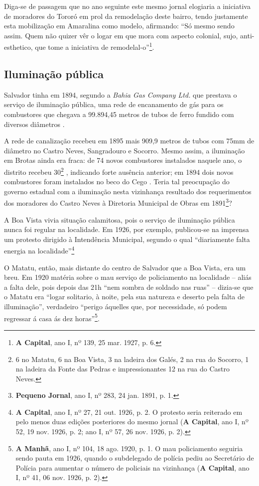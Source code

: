 Diga-se de passagem que no ano seguinte este mesmo jornal elogiaria a iniciativa de moradores do Tororó em prol da remodelação deste bairro, tendo justamente esta mobilização em Amaralina como modelo, afirmando: ``Só mesmo sendo assim. Quem não quizer vêr o logar em que mora com aspecto colonial, sujo, anti-esthetico, que tome a iniciativa de remodelal-o''\footnote{\textbf{A Capital}, ano I, nº 139, 25 mar. 1927, p. 6.}.


\subsection{Iluminação pública}


Salvador tinha em 1894, segundo a \textit{Bahia Gas Company Ltd.} que prestava o serviço de iluminação pública, uma rede de encanamento de gás para os combustores que chegava a 99.894,45 metros de tubos de ferro fundido com diversos diâmetros \cite[p.~178]{salvador_relatorio_1894}.

A rede de canalização recebeu em 1895 mais 909,9 metros de tubos com 75mm de diâmetro no Castro Neves, Sangradouro e Socorro. Mesmo assim, a iluminação em Brotas ainda era fraca: de 74 novos combustores instalados naquele ano, o distrito recebeu 30\footnote{6 no Matatu, 6 na Boa Vista, 3 na ladeira dos Galés, 2 na rua do Socorro, 1 na ladeira da Fonte das Pedras e impressionantes 12 na rua do Castro Neves.} \cite[pp.~149-150]{salvador_relatorio_1896}, indicando forte ausência anterior; em 1894 dois novos combustores foram instalados no beco do Cego \cite[p.~179]{salvador_relatorio_1894}. Teria tal preocupação do governo estadual com a iluminação nesta vizinhança resultado dos requerimentos dos moradores do Castro Neves à Diretoria Municipal de Obras em 1891\footnote{\textbf{Pequeno Jornal}, ano I, nº 283, 24 jan. 1891, p. 1.}? 

A Boa Vista vivia situação calamitosa, pois o serviço de iluminação pública nunca foi regular na localidade. Em 1926, por exemplo, publicou-se na imprensa um protesto dirigido à Intendência Municipal, segundo o qual ``diariamente falta energia na localidade''\footnote{\textbf{A Capital}, ano I, nº 27, 21 out. 1926, p. 2. O protesto seria reiterado em pelo menos duas edições posteriores do mesmo jornal (\textbf{A Capital}, ano I, nº 52, 19 nov. 1926, p. 2; ano I, nº 57, 26 nov. 1926, p. 2).}

O Matatu, então, mais distante do centro de Salvador que a Boa Vista, era um breu. Em 1920 matéria sobre o mau serviço de policiamento na localidade -- aliás a falta dele, pois depois das 21h ``nem sombra de soldado nas ruas'' -- dizia-se que o Matatu era ``logar solitario, à noite, pela sua natureza e deserto pela falta de illuminação'', verdadeiro ``perigo áquelles que, por necessidade, só podem regressar á casa ás dez horas''\footnote{\textbf{A Manhã}, ano I, nº 104, 18 ago. 1920, p. 1. O mau policiamento seguiria sendo pauta em 1926, quando o subdelegado de polícia pediu ao Secretário de Polícia para aumentar o número de policiais na vizinhança (\textbf{A Capital}, ano I, nº 41, 06 nov. 1926, p. 2).}.

